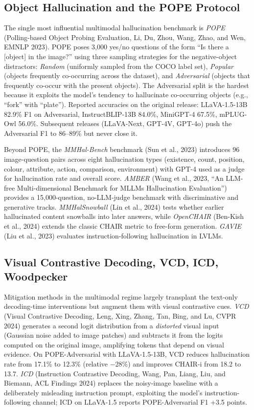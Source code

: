 \subsection{Object Hallucination and the POPE Protocol}\label{object-hallucination-and-the-pope-protocol}

The single most influential multimodal hallucination benchmark is \emph{POPE} (Polling-based Object Probing Evaluation, Li, Du, Zhou, Wang, Zhao, and Wen, EMNLP 2023). POPE poses 3,000 yes/no questions of the form ``Is there a {[}object{]} in the image?'' using three sampling strategies for the negative-object distractors: \emph{Random} (uniformly sampled from the COCO label set), \emph{Popular} (objects frequently co-occurring across the dataset), and \emph{Adversarial} (objects that frequently co-occur with the present objects). The Adversarial split is the hardest because it exploits the model's tendency to hallucinate co-occurring objects (e.g., ``fork'' with ``plate''). Reported accuracies on the original release: LLaVA-1.5-13B 82.9\% F1 on Adversarial, InstructBLIP-13B 84.0\%, MiniGPT-4 67.5\%, mPLUG-Owl 56.0\%. Subsequent releases (LLaVA-Next, GPT-4V, GPT-4o) push the Adversarial F1 to 86--89\% but never close it.

Beyond POPE, the \emph{MMHal-Bench} benchmark (Sun et al., 2023) introduces 96 image-question pairs across eight hallucination types (existence, count, position, colour, attribute, action, comparison, environment) with GPT-4 used as a judge for hallucination rate and overall score. \emph{AMBER} (Wang et al., 2023, ``An LLM-free Multi-dimensional Benchmark for MLLMs Hallucination Evaluation'') provides a 15,000-question, no-LLM-judge benchmark with discriminative and generative tracks. \emph{MMHalSnowball} (Lin et al., 2024) tests whether earlier hallucinated content snowballs into later answers, while \emph{OpenCHAIR} (Ben-Kish et al., 2024) extends the classic CHAIR metric to free-form generation. \emph{GAVIE} (Liu et al., 2023) evaluates instruction-following hallucination in LVLMs.

\subsection{Visual Contrastive Decoding, VCD, ICD, Woodpecker}\label{visual-contrastive-decoding-vcd-icd-woodpecker}

Mitigation methods in the multimodal regime largely transplant the text-only decoding-time interventions but augment them with visual contrastive cues. \emph{VCD} (Visual Contrastive Decoding, Leng, Xing, Zhang, Tan, Bing, and Lu, CVPR 2024) generates a second logit distribution from a \emph{distorted} visual input (Gaussian noise added to image patches) and subtracts it from the logits computed on the original image, amplifying tokens that depend on visual evidence. On POPE-Adversarial with LLaVA-1.5-13B, VCD reduces hallucination rate from 17.1\% to 12.3\% (relative −28\%) and improves CHAIR-i from 18.2 to 13.7. \emph{ICD} (Instruction Contrastive Decoding, Wang, Pan, Liang, Liu, and Biemann, ACL Findings 2024) replaces the noisy-image baseline with a deliberately misleading instruction prompt, exploiting the model's instruction-following channel; ICD on LLaVA-1.5 reports POPE-Adversarial F1 +3.5 points.

